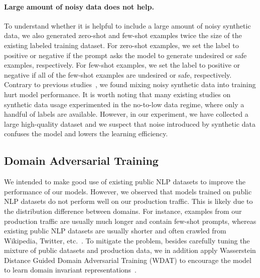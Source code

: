 \documentclass[letterpaper]{article} %
\begin{document}
\paragraph{Large amount of noisy data does not help.} To understand whether it is helpful to include a large amount of noisy synthetic data, we also generated zero-shot and few-shot examples twice the size of the existing labeled training dataset. For zero-shot examples, we set the label to positive or negative if the prompt asks the model to generate undesired or safe examples, respectively. For few-shot examples, we set the label to positive or negative if all of the few-shot examples are undesired or safe, respectively.
Contrary to previous studies~\cite{wang2021zerolabel,schick2021generating}, we found mixing noisy synthetic data into training hurt model performance. It is worth noting that many existing studies on synthetic data usage experimented in the no-to-low data regime, where only a handful of labels are available. However, in our experiment, we have collected a large high-quality dataset and we suspect that noise introduced by synthetic data confuses the model and lowers the learning efficiency.



\subsection{Domain Adversarial Training}
\label{sec:dat}

We intended to make good use of existing public NLP datasets to improve the performance of our models. However, we observed that models trained on public NLP datasets do not perform well on our production traffic. This is likely due to the distribution difference between domains. For instance, examples from our production traffic are usually much longer and contain few-shot prompts, whereas existing public NLP datasets are usually shorter and often crawled from Wikipedia, Twitter, etc.~\citep{vidgen2020garbage}.
To mitigate the problem, besides carefully tuning the mixture of public datasets and production data, we in addition apply Wasserstein Distance Guided Domain Adversarial Training (WDAT) to encourage the model to learn domain invariant representations~\citep{pmlr-v70-arjovsky17a, Ganin2016DomainAdversarialTO}.
\end{document}

